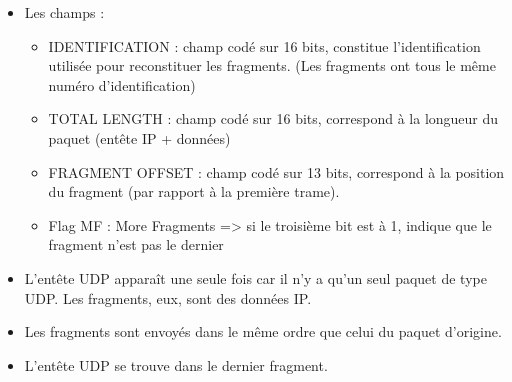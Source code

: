 \documentclass{article}
\begin{document}
\begin{itemize}\renewcommand{\labelitemi}{$\bullet$}
	\item Les champs :
	\begin{itemize}
		\item IDENTIFICATION : champ codé sur 16 bits, constitue l'identification utilisée pour reconstituer les fragments. (Les fragments ont tous le même numéro d'identification)
		\item TOTAL LENGTH : champ codé sur 16 bits, correspond à la longueur du paquet (entête IP + données)
		\item FRAGMENT OFFSET : champ codé sur 13 bits, correspond à la position du fragment (par rapport à la première trame).
		\item Flag MF : More Fragments => si le troisième bit est à 1, indique que le fragment n'est pas le dernier
	\end{itemize}
	\item L'entête UDP apparaît une seule fois car il n'y a qu'un seul paquet de type UDP. Les fragments, eux, sont des données IP.
	\item Les fragments sont envoyés dans le même ordre que celui du paquet d'origine.
	\item L'entête UDP se trouve dans le dernier fragment.
\end{itemize}
\end{document}
